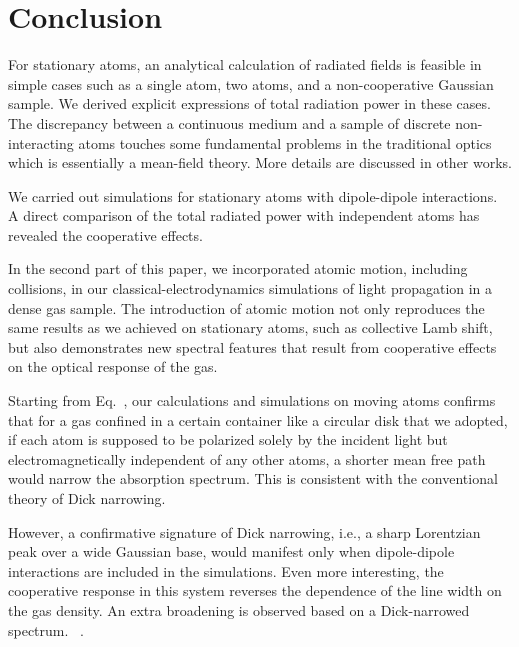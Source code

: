 \chapter{Conclusion}
For stationary atoms, an analytical calculation of radiated fields is feasible in simple cases such as a single atom, two atoms, and a non-cooperative Gaussian sample. We derived explicit expressions of total radiation power in these cases. The discrepancy between a continuous medium and a sample of discrete non-interacting atoms touches some fundamental problems in the traditional optics which is essentially a mean-field theory. More details are discussed in other works.

We carried out simulations for stationary atoms with dipole-dipole interactions. A direct comparison of the total radiated power with independent atoms has revealed the cooperative effects.

In the second part of this paper, we incorporated atomic motion, including collisions, in our classical-electrodynamics simulations of light propagation in a dense gas sample. The introduction of atomic motion not only reproduces the same results as we achieved on stationary atoms, such as collective Lamb shift, but also demonstrates new spectral features that result from cooperative effects on the optical response of the gas.

Starting from Eq.~, our calculations and simulations on moving atoms confirms that for a gas confined in a certain container like a circular disk that we adopted, if each atom is supposed to be polarized solely by the incident light but electromagnetically independent of any other atoms, a shorter mean free path would narrow the absorption spectrum. This is consistent with the conventional theory of Dick narrowing.

However, a confirmative signature of Dick narrowing, i.e., a sharp Lorentzian peak over a wide Gaussian base, would manifest only when dipole-dipole interactions are included in the simulations. Even more interesting, the cooperative response in this system reverses the dependence of the line width on the gas density. An extra broadening is observed based on a Dick-narrowed spectrum. ~\cite{Sci.325.1510}.
